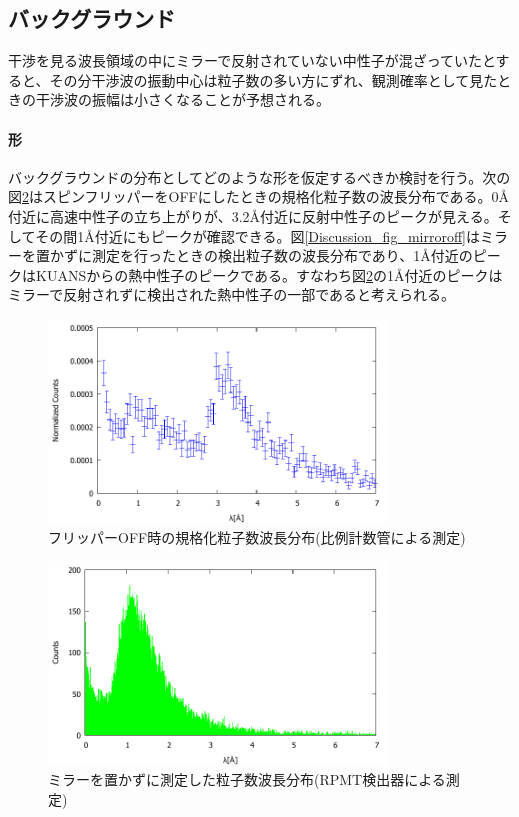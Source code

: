 \subsection{バックグラウンド}
干渉を見る波長領域の中にミラーで反射されていない中性子が混ざっていたとすると、その分干渉波の振動中心は粒子数の多い方にずれ、観測確率として見たときの干渉波の振幅は小さくなることが予想される。

\paragraph{形}
バックグラウンドの分布としてどのような形を仮定するべきか検討を行う。次の図\ref{Discussion_fig_flipperoff}はスピンフリッパーをOFFにしたときの規格化粒子数の波長分布である。0\AA 付近に高速中性子の立ち上がりが、3.2\AA 付近に反射中性子のピークが見える。そしてその間1\AA 付近にもピークが確認できる。図\ref{Discussion_fig_mirroroff}はミラーを置かずに測定を行ったときの検出粒子数の波長分布であり、1\AA 付近のピークはKUANSからの熱中性子のピークである。すなわち図\ref{Discussion_fig_flipperoff}の1\AA 付近のピークはミラーで反射されずに検出された熱中性子の一部であると考えられる。
\begin{figure}[H]
\centering
\includegraphics[width=9cm]{discussion/BG/flipperoff.pdf}
\caption{フリッパーOFF時の規格化粒子数波長分布(比例計数管による測定)}\label{Discussion_fig_flipperoff}
\end{figure}
\begin{figure}[H]
\centering
\includegraphics[width=9cm]{discussion/BG/mirroroff.pdf}
\caption{ミラーを置かずに測定した粒子数波長分布(RPMT検出器による測定)}\label{Discussion_fig_flipperoff}
\end{figure}

